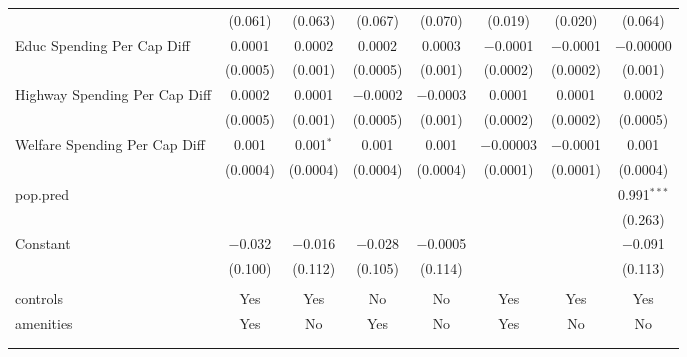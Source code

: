 \begin{table}[!htbp]
\begin{tabular}{@{\extracolsep{5pt}}lccccccc}
  & (0.061) & (0.063) & (0.067) & (0.070) & (0.019) & (0.020) & (0.064) \\ 
  Educ Spending Per Cap Diff & 0.0001 & 0.0002 & 0.0002 & 0.0003 & $-$0.0001 & $-$0.0001 & $-$0.00000 \\ 
  & (0.0005) & (0.001) & (0.0005) & (0.001) & (0.0002) & (0.0002) & (0.001) \\ 
  Highway Spending Per Cap Diff & 0.0002 & 0.0001 & $-$0.0002 & $-$0.0003 & 0.0001 & 0.0001 & 0.0002 \\ 
  & (0.0005) & (0.001) & (0.0005) & (0.001) & (0.0002) & (0.0002) & (0.0005) \\ 
  Welfare Spending Per Cap Diff & 0.001 & 0.001$^{*}$ & 0.001 & 0.001 & $-$0.00003 & $-$0.0001 & 0.001 \\ 
  & (0.0004) & (0.0004) & (0.0004) & (0.0004) & (0.0001) & (0.0001) & (0.0004) \\ 
  pop.pred &  &  &  &  &  &  & 0.991$^{***}$ \\ 
  &  &  &  &  &  &  & (0.263) \\ 
  Constant & $-$0.032 & $-$0.016 & $-$0.028 & $-$0.0005 &  &  & $-$0.091 \\ 
  & (0.100) & (0.112) & (0.105) & (0.114) &  &  & (0.113) \\ 
 \hline \\[-1.8ex] 
controls & Yes & Yes & No & No & Yes & Yes & Yes \\ 
amenities & Yes & No & Yes & No & Yes & No & No \\ 
\hline \\[-1.8ex] 
\hline 
\hline \\[-1.8ex] 
\end{tabular} 
\end{table} 
